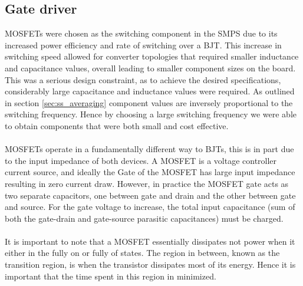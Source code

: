 \subsection{Gate driver}
\begin{figure}[H]
\centering
{}
\caption{}
\end{figure}
MOSFETs were chosen as the switching component in the SMPS due to its increased power efficiency and rate of switching over a BJT. This increase in switching speed allowed for converter topologies that required smaller inductance and capacitance values, overall leading to smaller component sizes on the board. This was a serious design constraint, as to achieve the desired specifications, considerably large capacitance and inductance values were required. As outlined in section \ref{sec:ss_averaging} component values are inversely proportional to the switching frequency. Hence by choosing a large switching frequency we were able to obtain components that were both small and cost effective.
\\ \\
MOSFETs operate in a fundamentally different way to BJTs, this is in part due to the input impedance of both devices. A MOSFET is a voltage controller current source, and ideally the Gate of the MOSFET has large input impedance resulting in zero current draw. However, in practice the MOSFET gate acts as two separate capacitors, one between gate and drain and the other between gate and source. For the gate voltage to increase, the total input capacitance (sum of both the gate-drain and gate-source parasitic capacitances) must be charged. 
\\ \\
It is important to note that a MOSFET essentially dissipates not power when it either in the fully on or fully of states. The region in between, known as the transition region, is when the transistor dissipates most of its energy. Hence it is important that the time spent in this region in minimized.
\\ \\
